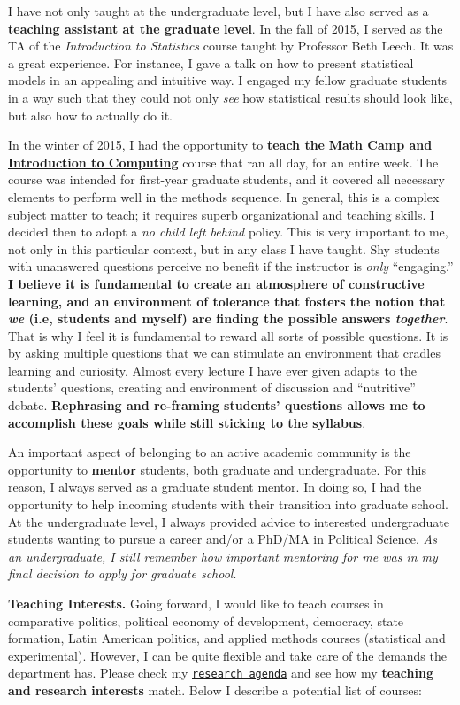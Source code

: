 I have not only taught at the undergraduate level, but I have also served as a {\bf teaching assistant at the graduate level}. In the fall of 2015, I served as the TA of the \emph{Introduction to Statistics} course taught by Professor Beth Leech. It was a great experience. For instance, I gave a talk on how to present statistical models in an appealing and intuitive way. I engaged my fellow graduate students in a way such that they could not only \emph{see} how statistical results should look like, but also how to actually do it. 

In the winter of 2015, I had the opportunity to {\bf teach the} \href{https://github.com/hbahamonde/Math-Camp/raw/master/Syllabus/Math_Camp_Syllabus.pdf}{{\bf Math Camp and Introduction to Computing}} course that ran all day, for an entire week. The course was intended for first-year graduate students, and it covered all necessary elements to perform well in the methods sequence. In general, this is a complex subject matter to teach; it requires superb organizational and teaching skills. I decided then to adopt a \emph{no child left behind} policy. This is very important to me, not only in this particular context, but in any class I have taught. Shy students with unanswered questions perceive no benefit if the instructor is \emph{only} ``engaging.'' {\bf I believe it is fundamental to create an atmosphere of constructive learning, and an environment of tolerance that fosters the notion that \emph{we} (i.e, students and myself) are finding the possible answers \emph{together}}. That is why I feel it is fundamental to reward all sorts of possible questions. It is by asking multiple questions that we can stimulate an environment that cradles learning and curiosity. Almost every lecture I have ever given adapts to the students' questions, creating and environment of discussion and ``nutritive'' debate. {\bf Rephrasing and re-framing students' questions allows me to accomplish these goals while still sticking to the syllabus}. 

An important aspect of belonging to an active academic community is the opportunity to {\bf mentor} students, both graduate and undergraduate. For this reason, I always served as a graduate student mentor. In doing so, I had the opportunity to help incoming students with their transition into graduate school. At the undergraduate level, I always provided advice to interested undergraduate students wanting to pursue a career and/or a PhD/MA in Political Science. \emph{As an undergraduate, I still remember how important mentoring for me was in my final decision to apply for graduate school}.

{\bf Teaching Interests.} Going forward, I would like to teach courses in comparative politics, political economy of development, democracy, state formation, Latin American politics, and applied methods courses (statistical and experimental). However, I can be quite flexible and take care of the demands the department has. Please check my \href{http://www.hectorbahamonde.com/research/}{\texttt{research agenda}} and see how my {\bf teaching and research interests} match. Below I describe a potential list of courses:
